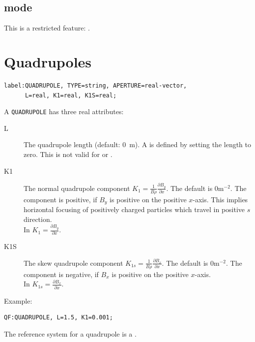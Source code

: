 \subsection{\opalcycl mode}

This is a restricted feature: \noopalcycl .

\section{Quadrupoles}
\label{sec:quadrupole}
\begin{verbatim}
label:QUADRUPOLE, TYPE=string, APERTURE=real-vector,
      L=real, K1=real, K1S=real;
\end{verbatim}
A \texttt{QUADRUPOLE} has three real attributes:
\begin{description}
\item[L]
  The quadrupole length (default: 0~m).
  A  is defined by setting the length to zero. This is not valid for \opalt or \opalcycl.
\item[K1]
  The normal quadrupole component
  $K_1=\frac{1}{B \rho}\frac{\partial B_y}{\partial x}$.
  The default is $0 \mathrm{m}^{-2}$.
  The component is positive, if $B_y$ is positive on the positive $x$-axis.
  This implies horizontal focusing of positively charged particles which
  travel in positive $s$ direction.\\
  In \opalt $K_1=\frac{\partial B_y}{\partial x}$.
\item[K1S]
  The skew quadrupole component
  $K_{1s}=\frac{1}{B \rho}\frac{\partial B_x}{\partial x}$.
  The default is $0 \mathrm{m}^{-2}$.
  The component is negative, if $B_x$ is positive on the positive $x$-axis.\\
In \opalt $K_{1s}=\frac{\partial B_x}{\partial x}$.
\end{description}
\noindent Example:
\begin{verbatim}
QF:QUADRUPOLE, L=1.5, K1=0.001;
\end{verbatim}
The reference system for a quadrupole is a 
.

